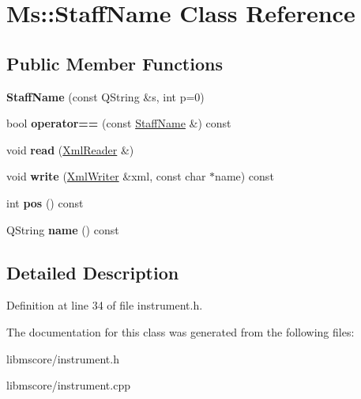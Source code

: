 \hypertarget{class_ms_1_1_staff_name}{}\section{Ms\+:\+:Staff\+Name Class Reference}
\label{class_ms_1_1_staff_name}
\subsection*{Public Member Functions}
\begin{DoxyCompactItemize}
\item 
\mbox{\label{class_ms_1_1_staff_name_af565231a6802f99924e6c5edb44e475e}} 
{\bfseries Staff\+Name} (const Q\+String \&s, int p=0)
\item 
\mbox{\label{class_ms_1_1_staff_name_afe238a071b49fd80ca8c4d88ba1922a4}} 
bool {\bfseries operator==} (const \hyperlink{class_ms_1_1_staff_name}{Staff\+Name} \&) const
\item 
\mbox{\label{class_ms_1_1_staff_name_a1f8c019d5a77f43d6b5aa0f41e0f97f1}} 
void {\bfseries read} (\hyperlink{class_ms_1_1_xml_reader}{Xml\+Reader} \&)
\item 
\mbox{\label{class_ms_1_1_staff_name_a431ffbb590f35df6dddfc51a5ebec39d}} 
void {\bfseries write} (\hyperlink{class_ms_1_1_xml_writer}{Xml\+Writer} \&xml, const char $\ast$name) const
\item 
\mbox{\label{class_ms_1_1_staff_name_a91951a8fc129f1433a5ccec6cbe89009}} 
int {\bfseries pos} () const
\item 
\mbox{\label{class_ms_1_1_staff_name_a5ce2d8402b665c5533b8ef9cbf7845dd}} 
Q\+String {\bfseries name} () const
\end{DoxyCompactItemize}


\subsection{Detailed Description}


Definition at line 34 of file instrument.\+h.



The documentation for this class was generated from the following files\+:\begin{DoxyCompactItemize}
\item 
libmscore/instrument.\+h\item 
libmscore/instrument.\+cpp\end{DoxyCompactItemize}
